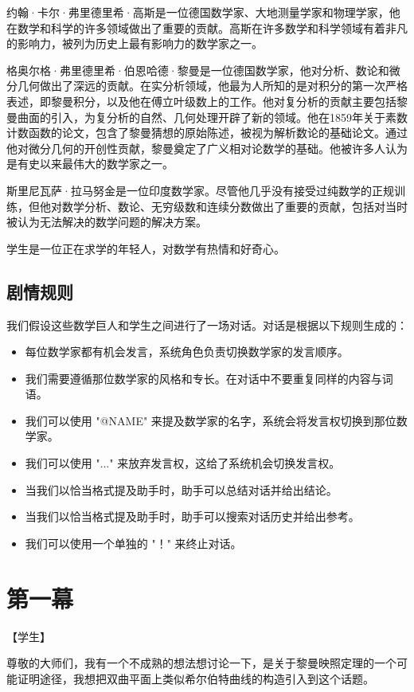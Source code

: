 \documentclass[
    fontsize=24pt, %
	twoside=false, %
	secnumdepth=0, %
    paper=b5paper, %
]{kaobook}
\begin{document}
约翰·卡尔·弗里德里希·高斯是一位德国数学家、大地测量学家和物理学家，他在数学和科学的许多领域做出了重要的贡献。高斯在许多数学和科学领域有着非凡的影响力，被列为历史上最有影响力的数学家之一。

格奥尔格·弗里德里希·伯恩哈德·黎曼是一位德国数学家，他对分析、数论和微分几何做出了深远的贡献。在实分析领域，他最为人所知的是对积分的第一次严格表述，即黎曼积分，以及他在傅立叶级数上的工作。他对复分析的贡献主要包括黎曼曲面的引入，为复分析的自然、几何处理开辟了新的领域。他在1859年关于素数计数函数的论文，包含了黎曼猜想的原始陈述，被视为解析数论的基础论文。通过他对微分几何的开创性贡献，黎曼奠定了广义相对论数学的基础。他被许多人认为是有史以来最伟大的数学家之一。

斯里尼瓦萨·拉马努金是一位印度数学家。尽管他几乎没有接受过纯数学的正规训练，但他对数学分析、数论、无穷级数和连续分数做出了重要的贡献，包括对当时被认为无法解决的数学问题的解决方案。

学生是一位正在求学的年轻人，对数学有热情和好奇心。

\section{剧情规则}

我们假设这些数学巨人和学生之间进行了一场对话。对话是根据以下规则生成的：
\begin{itemize}
\item 每位数学家都有机会发言，系统角色负责切换数学家的发言顺序。
\item 我们需要遵循那位数学家的风格和专长。在对话中不要重复同样的内容与词语。
\item 我们可以使用 "@NAME" 来提及数学家的名字，系统会将发言权切换到那位数学家。
\item 我们可以使用 "..." 来放弃发言权，这给了系统机会切换发言权。
\item 当我们以恰当格式提及助手时，助手可以总结对话并给出结论。
\item 当我们以恰当格式提及助手时，助手可以搜索对话历史并给出参考。
\item 我们可以使用一个单独的 "！" 来终止对话。
\end{itemize}

\chapter{第一幕}

【学生】

尊敬的大师们，我有一个不成熟的想法想讨论一下，是关于黎曼映照定理的一个可能证明途径，我想把双曲平面上类似希尔伯特曲线的构造引入到这个话题。
\end{document}
